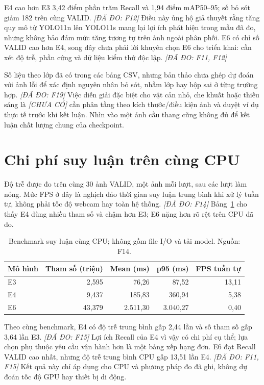 \documentclass[12pt,a4paper,oneside]{report}
\newcommand{\measured}[1]{\textit{[ĐÃ ĐO: #1]}}
\newcommand{\missing}{\textit{[CHƯA CÓ]}}
\begin{document}
E4 cao hơn E3 3,42 điểm phần trăm Recall và 1,94 điểm mAP50--95; số bỏ sót giảm 182 trên cùng VALID. \measured{F12} Điều này ủng hộ giả thuyết rằng tăng quy mô từ YOLO11n lên YOLO11s mang lại lợi ích phát hiện trong mẫu đã đo, nhưng không bảo đảm mức tăng tương tự trên ảnh ngoài phân phối. E6 có chỉ số VALID cao hơn E4, song đây chưa phải lời khuyên chọn E6 cho triển khai: cần xét độ trễ, phần cứng và dữ liệu kiểm thử độc lập. \measured{F11, F12}

Số liệu theo lớp đã có trong các bảng CSV, nhưng bản thảo chưa ghép dự đoán với ảnh lỗi để xác định nguyên nhân bỏ sót, nhầm lớp hay hộp sai ở từng trường hợp. \measured{F19} Việc diễn giải đặc biệt cho vật cản nhỏ, che khuất hoặc thiếu sáng là \missing\; cần phân tầng theo kích thước/điều kiện ảnh và duyệt ví dụ thực tế trước khi kết luận. Nhìn vào một ảnh cầu thang cũng không đủ để kết luận chất lượng chung của checkpoint.

\section{Chi phí suy luận trên cùng CPU}
Độ trễ được đo trên cùng 30 ảnh VALID, một ảnh mỗi lượt, sau các lượt làm nóng. Mức FPS ở đây là nghịch đảo thời gian suy luận trung bình khi xử lý tuần tự, không phải tốc độ webcam hay toàn hệ thống. \measured{F14} Bảng~\ref{tab:benchmark} cho thấy E4 dùng nhiều tham số và chậm hơn E3; E6 nặng hơn rõ rệt trên CPU đã đo.

\begin{table}[htbp]\centering\small
\caption{Benchmark suy luận cùng CPU; không gồm file I/O và tải model. Nguồn: F14.}\label{tab:benchmark}
\begin{tabular}{lrrrr}\toprule
Mô hình & Tham số (triệu) & Mean (ms) & p95 (ms) & FPS tuần tự\\\midrule
E3 & 2,595 & 76,26 & 87,52 & 13,11\\
E4 & 9,437 & 185,83 & 360,94 & 5,38\\
E6 & 43,379 & 2.511,30 & 3.040,27 & 0,40\\\bottomrule
\end{tabular}
\end{table}

Theo cùng benchmark, E4 có độ trễ trung bình gấp 2,44 lần và số tham số gấp 3,64 lần E3. \measured{F15} Lợi ích Recall của E4 vì vậy có chi phí cụ thể; lựa chọn phụ thuộc yêu cầu vận hành hơn là một bảng xếp hạng đơn. E6 đạt Recall VALID cao nhất, nhưng độ trễ trung bình CPU gấp 13,51 lần E4. \measured{F11, F15} Kết quả này chỉ áp dụng cho CPU và phương pháp đo đã ghi, không dự đoán tốc độ GPU hay thiết bị di động.
\end{document}
